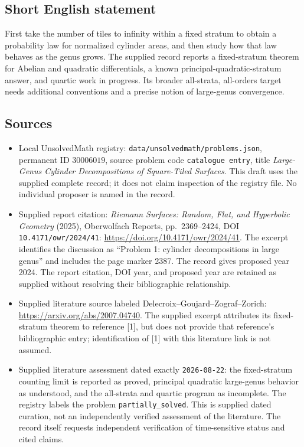 \documentclass[11pt]{article}
\begin{document}
\subsection{Short English statement}
First take the number of tiles to infinity within a fixed stratum to obtain a probability law for normalized cylinder areas, and then study how that law behaves as the genus grows. The supplied record reports a fixed-stratum theorem for Abelian and quadratic differentials, a known principal-quadratic-stratum answer, and quartic work in progress. Its broader all-strata, all-orders target needs additional conventions and a precise notion of large-genus convergence.
\subsection{Sources}
\begin{itemize}
\item Local UnsolvedMath registry: \texttt{data/unsolvedmath/problems.json}, permanent ID \(30006019\), source problem code \texttt{catalogue entry}, title \emph{Large-Genus Cylinder Decompositions of Square-Tiled Surfaces}. This draft uses the supplied complete record; it does not claim inspection of the registry file. No individual proposer is named in the record.
\item Supplied report citation: \emph{Riemann Surfaces: Random, Flat, and Hyperbolic Geometry} (2025), Oberwolfach Reports, pp.\ 2369--2424, DOI \texttt{10.4171/owr/2024/41}: \url{https://doi.org/10.4171/owr/2024/41}. The excerpt identifies the discussion as ``Problem 1: cylinder decompositions in large genus'' and includes the page marker 2387. The record gives proposed year 2024. The report citation, DOI year, and proposed year are retained as supplied without resolving their bibliographic relationship.
\item Supplied literature source labeled Delecroix--Goujard--Zograf--Zorich: \url{https://arxiv.org/abs/2007.04740}. The supplied excerpt attributes its fixed-stratum theorem to reference [1], but does not provide that reference's bibliographic entry; identification of [1] with this literature link is not assumed.
\item Supplied literature assessment dated exactly \texttt{2026-08-22}: the fixed-stratum counting limit is reported as proved, principal quadratic large-genus behavior as understood, and the all-strata and quartic program as incomplete. The registry labels the problem \texttt{partially\_solved}. This is supplied dated curation, not an independently verified assessment of the literature. The record itself requests independent verification of time-sensitive status and cited claims.
\end{itemize}
\end{document}
